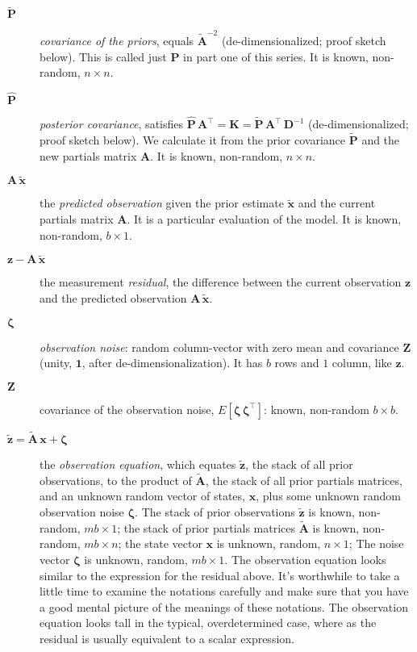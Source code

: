 \documentclass[10pt,oneside,x11names]{article}
\begin{document}
\begin{description}
\item[{\({\tilde{\mathbold{P}}}\)}] \emph{covariance of the priors}, equals
\({\tilde{\mathbold{A}}}^{-2}\)
(de-dimensionalized; proof sketch
below). This is called just \(\mathbold{P}\) in part one of this series.
It is known, non-random, \(n\times{n}\).

\item[{\({\hat{\mathbold{P}}}\)}] \emph{posterior covariance}, satisfies
\({\hat{\mathbold{P}}}\,
     {\mathbold{A}}^\intercal=
     \mathbold{K}=
     {\tilde{\mathbold{P}}}\,\mathbold{A}^\intercal\,\mathbold{D}^{-1}\)
(de-dimensionalized; proof sketch below). We calculate it from the prior covariance
\(\tilde{\mathbold{P}}\) and the new
partials matrix \(\mathbold{A}\). 
It is known, non-random, \(n\times{n}\).

\item[{\(\mathbold{A}\,{\tilde{\mathbold{x}}}\)}] the \emph{predicted observation} given
the prior estimate \({\tilde{\mathbold{x}}}\) and the current partials matrix
\(\mathbold{A}\). It is a particular evaluation of the model. It is known,
non-random, \(b\times{1}\).

\item[{\(\mathbold{z}-\mathbold{A}\,{\tilde{\mathbold{x}}}\)}] the measurement
\emph{residual}, the difference between the current observation \(\mathbold{z}\) and the
predicted observation \(\mathbold{A}\,{\tilde{\mathbold{x}}}\).

\item[{\(\mathbold{\zeta}\)}] \emph{observation noise}: random column-vector with
zero mean and covariance \(\mathbold{Z}\) (unity, \(\mathbold{1}\), after
de-dimensionalization).
It has \(b\) rows and \(1\) column, like \(\mathbold{z}\).

\item[{\(\mathbold{Z}\)}] covariance of the observation noise, \(E
     \left[
     \mathbold{\zeta}\,
     \mathbold{\zeta}^\intercal
     \right]\): known, non-random \(b\times{b}\).

\item[{\(\tilde{\mathbold{z}} = \tilde{\mathbold{A}}\,{\mathbold{x}} + \mathbold{\zeta}\)}] the
\emph{observation equation}, which equates \(\tilde{\mathbold{z}}\), the stack of
all prior observations, to the product of \(\tilde{\mathbold{A}}\), the stack
of all prior partials matrices, and an unknown random vector of states,
\(\mathbold{x}\), plus some unknown random observation noise
\(\mathbold{\zeta}\).  The stack of prior observations
\(\tilde{\mathbold{z}}\) is known, non-random, \(m b\times{1}\); the stack of prior
partials matrices
\(\tilde{\mathbold{A}}\) is known, non-random, \(m b\times{n}\); the state vector \({\mathbold{x}}\)
is unknown, random, \(n\times{1}\); The noise vector \(\mathbold{\zeta}\) is unknown, random,
\(m b\times{1}\). The observation equation looks similar to the expression for the residual
above. It's worthwhile to take a little time to examine the notations carefully and make sure
that you have a good mental picture of the meanings of these notations. The
observation equation looks tall in the typical, overdetermined case, where
as the residual is usually equivalent to a scalar expression.


\end{description}
\end{document}
